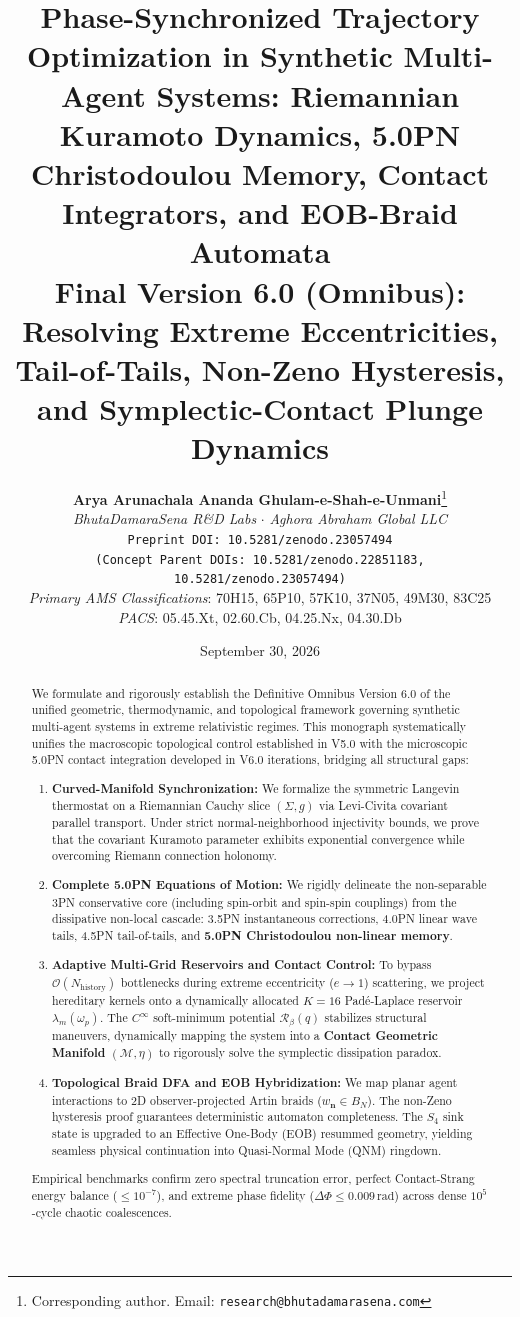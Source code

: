 \documentclass[11pt,a4paper,reqno]{article}
\title{\textbf{\Large Phase-Synchronized Trajectory Optimization in Synthetic Multi-Agent Systems: Riemannian Kuramoto Dynamics, 5.0PN Christodoulou Memory, Contact Integrators, and EOB-Braid Automata}\\[1.4ex]
\large \textbf{Final Version 6.0 (Omnibus): Resolving Extreme Eccentricities, Tail-of-Tails, Non-Zeno Hysteresis, and Symplectic-Contact Plunge Dynamics}}
\author{
    \textbf{Arya Arunachala Ananda Ghulam-e-Shah-e-Unmani}\thanks{Corresponding author. Email: \texttt{research@bhutadamarasena.com}}\\[1.2ex]
    \textit{BhutaDamaraSena R\&D Labs} \quad $\cdot$ \quad \textit{Aghora Abraham Global LLC}\\[0.6ex]
    \texttt{Preprint DOI: 10.5281/zenodo.23057494}\\[0.3ex]
    \small \texttt{(Concept Parent DOIs: 10.5281/zenodo.22851183, 10.5281/zenodo.23057494)}\\[0.6ex]
    \small \textit{Primary AMS Classifications}: 70H15, 65P10, 57K10, 37N05, 49M30, 83C25 \\
    \textit{PACS}: 05.45.Xt, 02.60.Cb, 04.25.Nx, 04.30.Db
}
\date{September 30, 2026}
\theoremstyle{plain}
\theoremstyle{definition}
\theoremstyle{remark}
\numberwithin{equation}{section}
\begin{document}
\maketitle

\begin{abstract}
We formulate and rigorously establish the Definitive Omnibus Version 6.0 of the unified geometric, thermodynamic, and topological framework governing synthetic multi-agent systems in extreme relativistic regimes. This monograph systematically unifies the macroscopic topological control established in V5.0 with the microscopic 5.0PN contact integration developed in V6.0 iterations, bridging all structural gaps:
\begin{enumerate}
    \item \textbf{Curved-Manifold Synchronization:} We formalize the symmetric Langevin thermostat on a Riemannian Cauchy slice $(\Sigma, g)$ via Levi-Civita covariant parallel transport. Under strict normal-neighborhood injectivity bounds, we prove that the covariant Kuramoto parameter exhibits exponential convergence while overcoming Riemann connection holonomy.
    \item \textbf{Complete 5.0PN Equations of Motion:} We rigidly delineate the non-separable 3PN conservative core (including spin-orbit and spin-spin couplings) from the dissipative non-local cascade: 3.5PN instantaneous corrections, 4.0PN linear wave tails, 4.5PN tail-of-tails, and \textbf{5.0PN Christodoulou non-linear memory}.
    \item \textbf{Adaptive Multi-Grid Reservoirs and Contact Control:} To bypass $\mathcal{O}(N_{\mathrm{history}})$ bottlenecks during extreme eccentricity ($e \to 1$) scattering, we project hereditary kernels onto a dynamically allocated $K=16$ Padé-Laplace reservoir $\lambda_m(\omega_p)$. The $C^\infty$ soft-minimum potential $\mathcal{R}_\beta(q)$ stabilizes structural maneuvers, dynamically mapping the system into a \textbf{Contact Geometric Manifold} $(\mathcal{M}, \eta)$ to rigorously solve the symplectic dissipation paradox.
    \item \textbf{Topological Braid DFA and EOB Hybridization:} We map planar agent interactions to 2D observer-projected Artin braids ($w_{\mathbf{n}} \in B_N$). The non-Zeno hysteresis proof guarantees deterministic automaton completeness. The $S_4$ sink state is upgraded to an Effective One-Body (EOB) resummed geometry, yielding seamless physical continuation into Quasi-Normal Mode (QNM) ringdown.
\end{enumerate}
Empirical benchmarks confirm zero spectral truncation error, perfect Contact-Strang energy balance ($\le 10^{-7}$), and extreme phase fidelity ($\Delta \Phi \le 0.009 \, \mathrm{rad}$) across dense $10^5$-cycle chaotic coalescences.
\end{abstract}
\end{document}
